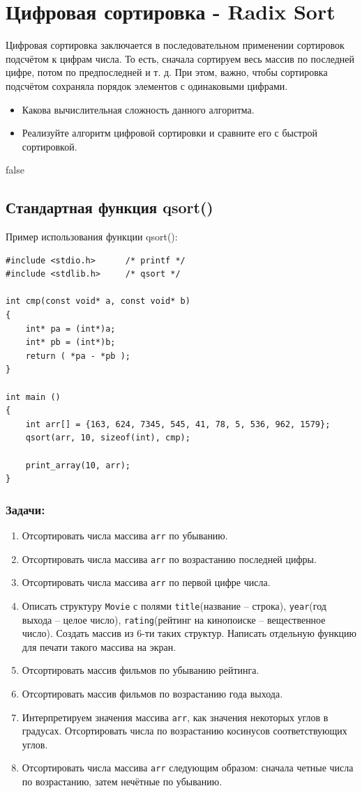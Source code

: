 \documentclass{article}
\begin{document}
\section*{Цифровая сортировка - Radix Sort}
Цифровая сортировка заключается в последовательном применении сортировок подсчётом к цифрам числа. То есть, сначала сортируем весь массив по последней цифре, потом по предпоследней и т. д. При этом, важно, чтобы сортировка подсчётом сохраняла порядок элементов с одинаковыми цифрами.
\begin{itemize}
\item Какова вычислительная сложность данного алгоритма.
\item Реализуйте алгоритм цифровой сортировки и сравните его с быстрой сортировкой.
\end{itemize}
\newpage


\if false
\subsection*{Стандартная функция qsort()}

Пример использования функции qsort():
\begin{verbatim}
#include <stdio.h>      /* printf */
#include <stdlib.h>     /* qsort */

int cmp(const void* a, const void* b)
{
    int* pa = (int*)a;
    int* pb = (int*)b;
    return ( *pa - *pb );
}

int main ()
{
    int arr[] = {163, 624, 7345, 545, 41, 78, 5, 536, 962, 1579};
    qsort(arr, 10, sizeof(int), cmp);
   
    print_array(10, arr);
}
\end{verbatim}


\subsubsection*{Задачи:}
\begin{enumerate}
\item Отсортировать числа массива \texttt{arr} по убыванию.
\item Отсортировать числа массива \texttt{arr} по возрастанию последней цифры.
\item Отсортировать числа массива \texttt{arr} по первой цифре числа.
\item Описать структуру \texttt{Movie} с полями \texttt{title}(название -- строка), \texttt{year}(год выхода -- целое число), \texttt{rating}(рейтинг на кинопоиске -- вещественное число). Создать массив из 6-ти таких структур. Написать отдельную функцию для печати такого массива на экран.
\item Отсортировать массив фильмов по убыванию рейтинга. 
\item Отсортировать массив фильмов по возрастанию года выхода. 
\item Интерпретируем значения массива \texttt{arr}, как значения некоторых углов в градусах. Отсортировать числа по возрастанию косинусов соответствующих углов.
\item Отсортировать числа массива \texttt{arr} следующим образом: сначала четные числа по возрастанию, затем нечётные по убыванию.
\end{enumerate}

\fi
\end{document}
